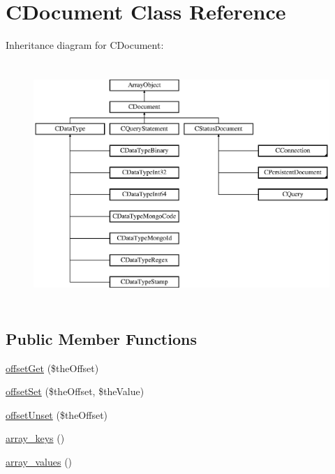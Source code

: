 \hypertarget{class_c_document}{\section{C\-Document Class Reference}
\label{class_c_document}
}
Inheritance diagram for C\-Document\-:\begin{figure}[H]
\begin{center}
\leavevmode
\includegraphics[height=9.210526cm]{class_c_document}
\end{center}
\end{figure}
\subsection*{Public Member Functions}
\begin{DoxyCompactItemize}
\item 
\hyperlink{class_c_document_a7e03e4fd9674ba52b26589d01ca42027}{offset\-Get} (\$the\-Offset)
\item 
\hyperlink{class_c_document_a0fe390a5ce89bc8dd12062276b53154b}{offset\-Set} (\$the\-Offset, \$the\-Value)
\item 
\hyperlink{class_c_document_a1d4b8ba2553520c323edcde52a4113e3}{offset\-Unset} (\$the\-Offset)
\item 
\hyperlink{class_c_document_a1809f3de22bc07e0c57d2ceb0b951ce0}{array\-\_\-keys} ()
\item 
\hyperlink{class_c_document_a82d9b209627c76363fec8c879e4e6225}{array\-\_\-values} ()
\end{DoxyCompactItemize}


